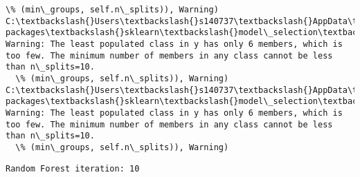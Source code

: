 \documentclass[11pt]{article}
\begin{document}
\begin{Verbatim}[commandchars=\\\{\}]
  \% (min\_groups, self.n\_splits)), Warning)
C:\textbackslash{}Users\textbackslash{}s140737\textbackslash{}AppData\textbackslash{}Local\textbackslash{}Continuum\textbackslash{}anaconda3\textbackslash{}lib\textbackslash{}site-packages\textbackslash{}sklearn\textbackslash{}model\_selection\textbackslash{}\_split.py:605: Warning: The least populated class in y has only 6 members, which is too few. The minimum number of members in any class cannot be less than n\_splits=10.
  \% (min\_groups, self.n\_splits)), Warning)
C:\textbackslash{}Users\textbackslash{}s140737\textbackslash{}AppData\textbackslash{}Local\textbackslash{}Continuum\textbackslash{}anaconda3\textbackslash{}lib\textbackslash{}site-packages\textbackslash{}sklearn\textbackslash{}model\_selection\textbackslash{}\_split.py:605: Warning: The least populated class in y has only 6 members, which is too few. The minimum number of members in any class cannot be less than n\_splits=10.
  \% (min\_groups, self.n\_splits)), Warning)

    \end{Verbatim}

    \begin{Verbatim}[commandchars=\\\{\}]
Random Forest iteration: 10 

    \end{Verbatim}
\end{document}
